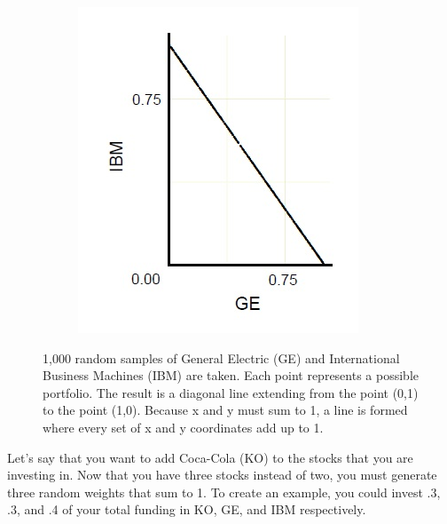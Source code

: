 \documentclass{article}\usepackage{graphicx, color}
\begin{document}
\begin{figure}[H]
  \begin{subfigure}[b]{0.7\textwidth}
      \centering
      \includegraphics[width=\textwidth]{samples}
      \label{fig:samples}
  \end{subfigure}
\caption{1,000 random samples of General Electric (GE) and International Business Machines (IBM) are taken. Each point represents a possible portfolio. The result is a diagonal line extending from the point (0,1) to the point (1,0). Because x and y must sum to 1, a line is formed where every set of x and y coordinates add up to 1.}
\end{figure}

Let's say that you want to add Coca-Cola (KO) to the stocks that you are investing in. Now that you have three stocks instead of two, you must generate three random weights that sum to 1. To create an example, you could invest .3, .3, and .4 of your total funding in KO, GE, and IBM respectively. 
  
\end{document}
